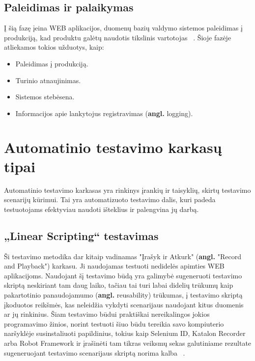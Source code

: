 \documentclass[a4paper,12pt,fleqn]{article}
\begin{document}
\subsection{Paleidimas ir palaikymas}
Į šią fazę įeina WEB aplikacijos, duomenų bazių valdymo sistemos paleidimas į produkciją, kad produktu galėtų naudotis tikslinis vartotojas ~\cite{french1970web}. Šioje fazėje atliekamos tokios užduotys, kaip:

\begin{itemize}
    \item Paleidimas į produkciją.
    \item Turinio atnaujinimas.
    \item Sistemos stebėsena.
    \item Informacijos apie lankytojus registravimas (\textbf{angl.} logging).
\end{itemize}

\section{Automatinio testavimo karkasų tipai}
Automatinio testavimo karkasas yra rinkinys įrankių ir taisyklių, skirtų testavimo scenarijų kūrimui. Tai yra automatizuoto testavimo dalis, kuri padeda testuotojams efektyviau naudoti išteklius ir palengvina jų darbą.

\subsection{„Linear Scripting“ testavimas}
Ši testavimo metodika dar kitaip vadinamas "Įrašyk ir Atkurk" (\textbf{angl.} "Record and Playback") karkasu. Ji naudojamas testuoti nedidelės apimties WEB aplikacijoms. Naudojant šį testavimo būdą yra galimybė sugeneruoti testavimo skriptą neskiriant tam daug laiko, tačiau tai turi labai didelių trūkumų kaip pakartotinio panaudojamumo (\textbf{angl.} reusability) trūkumas, į testavimo skriptą įkoduotos reikšmės, kas neleidžia vykdyti scenarijaus naudojant kitus duomenis ar jų rinkinius. Šiam testavimo būdui praktiškai nereikalingos jokios programavimo žinios, norint testuoti šiuo būdu tereikia savo kompiuterio naršyklėje susinstaliuoti papildinius, tokius kaip Selenium ID, Katalon Recorder arba Robot Framework ir įrašinėti tam tikras veiksmų sekas galutiniame rezultate sugeneruojant testavimo scenarijaus skriptą norima kalba ~\cite{meszaros2003agile}.
\end{document}

